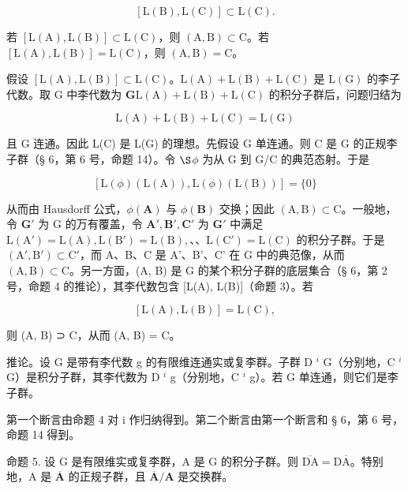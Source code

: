 \[
[ \mathrm{L} (\mathrm{B}), \mathrm{L} (\mathrm{C}) ] \subset \mathrm{L} (\mathrm{C}).
\]

若 \([\mathrm{L}(\mathrm{A}),\mathrm{L}(\mathrm{B})]\subset \mathrm{L}(\mathrm{C})\)，则 \((\mathrm{A},\mathrm{B})\subset \mathrm{C}\)。若 \([\mathrm{L}(\mathrm{A}),\mathrm{L}(\mathrm{B})] = \mathrm{L}(\mathrm{C})\)，则 \((\mathrm{A},\mathrm{B}) = \mathrm{C}\)。

假设 \([\mathrm{L}(\mathrm{A}),\mathrm{L}(\mathrm{B})]\subset \mathrm{L}(\mathrm{C})\)。\(\mathrm{L}(\mathrm{A}) + \mathrm{L}(\mathrm{B}) + \mathrm{L}(\mathrm{C})\) 是 \(\mathrm{L}(\mathrm{G})\) 的李子代数。取 G 中李代数为 \(\mathbf{G}\)\(\mathrm{L}(\mathrm{A}) + \mathrm{L}(\mathrm{B}) + \mathrm{L}(\mathrm{C})\) 的积分子群后，问题归结为

\[
\mathrm{L} (\mathrm{A}) + \mathrm{L} (\mathrm{B}) + \mathrm{L} (\mathrm{C}) = \mathrm{L} (\mathrm{G})
\]

且 G 连通。因此 L(C) 是 L(G) 的理想。先假设 G 单连通。则 C 是 G 的正规李子群（§ 6，第 6 号，命题 14）。令 \(\S\)\(\phi\) 为从 G 到 G/C 的典范态射。于是

\[
[ \mathrm{L} (\phi) (\mathrm{L} (\mathrm{A})), \mathrm{L} (\phi) (\mathrm{L} (\mathrm{B})) ] = \{0 \}
\]

从而由 Hausdorff 公式，\(\phi (\mathbf{A})\) 与 \(\phi (\mathbf{B})\) 交换；因此 \((\mathrm{A},\mathrm{B})\subset \mathrm{C}\)。一般地，令 \(\mathbf{G}'\) 为 G 的万有覆盖，令 \(\mathbf{A}',\mathbf{B}',\mathbf{C}'\) 为 \(\mathbf{G}'\) 中满足 \(\mathrm{L}(\mathrm{A}') = \mathrm{L}(\mathrm{A}),\mathrm{L}(\mathrm{B}') = \mathrm{L}(\mathrm{B}),\)、、\(\mathrm{L}(\mathrm{C}') = \mathrm{L}(\mathrm{C})\) 的积分子群。于是 \((\mathrm{A}',\mathrm{B}')\subset \mathrm{C}'\)，而 A、B、C 是 A'、B'、C' 在 G 中的典范像，从而 \((\mathrm{A},\mathrm{B})\subset \mathrm{C}\)。另一方面，(A, B) 是 G 的某个积分子群的底层集合（§ 6，第 2 号，命题 4 的推论），其李代数包含 [L(A), L(B)]（命题 3）。若

\[
[ \mathrm{L} (\mathrm{A}), \mathrm{L} (\mathrm{B}) ] = \mathrm{L} (\mathrm{C}),
\]

则 (A, B) ⊃ C，从而 (A, B) = C。

推论。设 G 是带有李代数 g 的有限维连通实或复李群。子群 D \(^{i}\) G（分别地，C \(^{i}\) G）是积分子群，其李代数为 D \(^{i}\) g（分别地，C \(^{i}\) g）。若 G 单连通，则它们是李子群。

第一个断言由命题 4 对 i 作归纳得到。第二个断言由第一个断言和 § 6，第 6 号，命题 14 得到。

命题 5. 设 G 是有限维实或复李群，A 是 G 的积分子群。则 \(\overline{\mathrm{D}\mathrm{A}} = \mathrm{D}\overline{\mathrm{A}}\)。特别地，A 是 \(\overline{\mathbf{A}}\) 的正规子群，且 \(\overline{\mathbf{A}} / \mathbf{A}\) 是交换群。

